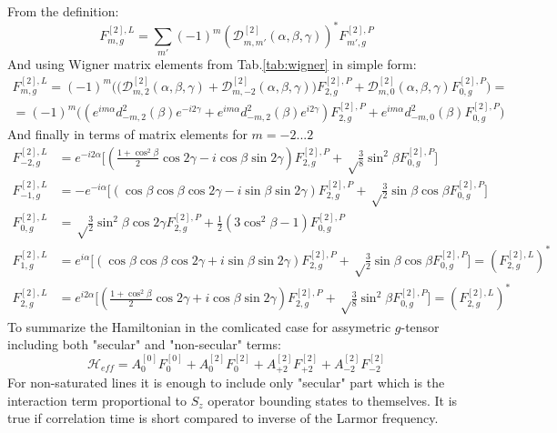 From the definition:
\begin{equation}
F^{[2],L}_{m,g}=\sum_{m'}(-1)^m(\mathcal{D}^{[2]}_{m,m'}(\alpha,\beta,\gamma))^*F^{[2],P}_{m',g}
\end{equation}
And using Wigner matrix elements from Tab.\ref{tab:wigner} in simple form:  
\begin{multline}\label{eq:tensorzeem}
F^{[2],L}_{m,g}=(-1)^m\Big(\big(\mathcal{D}^{[2]}_{m,2}(\alpha,\beta,\gamma)+\mathcal{D}^{[2]}_{m,-2}(\alpha,\beta,\gamma))F^{[2],P}_{2,g}+\mathcal{D}^{[2]}_{m,0}(\alpha,\beta,\gamma)F^{[2],P}_{0,g}\Big)= \\ =(-1)^m\Big((e^{im\alpha}d_{-m,2}^2(\beta)e^{-i2\gamma}+e^{im\alpha}d_{-m,2}^2(\beta)e^{i2\gamma}) F^{[2],P}_{2,g}+e^{im\alpha}d_{-m,0}^2(\beta)F^{[2],P}_{0,g}\Big)
\end{multline}
And finally in terms of matrix elements for $m=-2...2$
\begin{subequations}\label{eq:dmatel}
\begin{align}
F^{[2],L}_{-2,g}& = e^{-i2\alpha}\Big[(\frac{1+\cos^2\beta}{2}\cos2\gamma-i\cos\beta\sin2\gamma) F^{[2],P}_{2,g}+\sqrt\frac{3}{8}\sin^2\beta F^{[2],P}_{0,g} \Big]\\
F^{[2],L}_{-1,g}& = -e^{-i\alpha}\Big[(\cos\beta\cos\beta\cos2\gamma-i\sin\beta\sin2\gamma) F^{[2],P}_{2,g}+\sqrt\frac{3}{2}\sin\beta\cos\beta F^{[2],P}_{0,g} \Big]\\
F^{[2],L}_{0,g}& = \sqrt\frac{3}{2}\sin^2\beta\cos2\gamma F^{[2],P}_{2,g}+\frac{1}{2}(3\cos^2\beta-1)F^{[2],P}_{0,g} \\
F^{[2],L}_{1,g}& = e^{i\alpha}\Big[(\cos\beta\cos\beta\cos2\gamma+i\sin\beta\sin2\gamma) F^{[2],P}_{2,g}+\sqrt\frac{3}{2}\sin\beta\cos\beta F^{[2],P}_{0,g} \Big]=(F^{[2],L}_{2,g})^*\\
F^{[2],L}_{2,g}& = e^{i2\alpha}\Big[(\frac{1+\cos^2\beta}{2}\cos2\gamma+i\cos\beta\sin2\gamma) F^{[2],P}_{2,g}+\sqrt\frac{3}{8}\sin^2\beta F^{[2],P}_{0,g} \Big]=(F^{[2],L}_{2,g})^*
\end{align}
\end{subequations}
To summarize the Hamiltonian in the comlicated case for assymetric $g$-tensor including both "secular" and "non-secular" terms: 
\begin{equation}
\mathcal{H}_{eff}=A_0^{[0]}F_0^{[0]}+A_0^{[2]} F_0^{[2]}+A_{+2}^{[2]} F_{+2}^{[2]}+A_{-2}^{[2]} F_{-2}^{[2]}
\end{equation}
For non-saturated lines it is enough to include only "secular" part which is the interaction term proportional to $S_z$ operator bounding states to themselves. It is true if correlation time is short compared to inverse of the Larmor frequency. 
